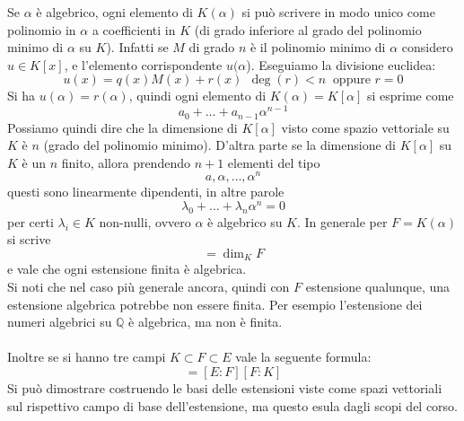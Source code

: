 \begin{osservazione}
	Se $\alpha$ è algebrico, ogni elemento di $K(\alpha)$ si può scrivere in modo unico come polinomio in $\alpha$ a coefficienti in $K$ (di grado inferiore al grado del polinomio minimo di $\alpha$ su $K$). Infatti se $M$ di grado $n$ è il polinomio minimo di $\alpha$ considero $u\in K[x]$, e l'elemento corrispondente $u(\alpha$). Eseguiamo la divisione euclidea:
	\begin{equation*}
	u(x)=q(x)M(x)+r(x) \ \ \deg(r)<n \ \text{ oppure } r=0
	\end{equation*}
	Si ha $u(\alpha)=r(\alpha)$, quindi ogni elemento di $K(\alpha)=K[\alpha]$ si esprime come 
	\begin{equation*}
	a_0+\dots+a_{n-1}\alpha^{n-1}
	\end{equation*}
	Possiamo quindi dire che la dimensione di $K[\alpha]$ visto come spazio vettoriale su $K$ è $n$ (grado del polinomio minimo). D'altra parte se la dimensione di $K[\alpha]$ su $K$ è un $n$ finito, allora prendendo $n+1$ elementi del tipo
	\begin{equation*}
	a,\alpha,\dots,\alpha^n
	\end{equation*}
	questi sono linearmente dipendenti, in altre parole
	\begin{equation*}
	\lambda_0+\dots+\lambda_n\alpha^n=0
	\end{equation*}
	per certi $\lambda_i\in K$ non-nulli, ovvero $\alpha$ è algebrico su $K$.
	In generale per $F=K(\alpha)$ si scrive 
	\begin{equation*}
	[F:K]=\dim_K F
	\end{equation*}
	e vale che ogni estensione finita è algebrica. \\ Si noti che nel caso più generale ancora, quindi con $F$ estensione qualunque, una estensione algebrica potrebbe non essere finita. Per esempio l'estensione dei numeri algebrici su $\mathbb{Q}$ è algebrica, ma non è finita. \\ \\ Inoltre se si hanno tre campi $K\subset F\subset E$ vale la seguente formula:
	\begin{equation*}
	[E:K]=[E:F][F:K]
	\end{equation*}
	Si può dimostrare costruendo le basi delle estensioni viste come spazi vettoriali sul rispettivo campo di base dell'estensione, ma questo esula dagli scopi del corso.
\end{osservazione}



